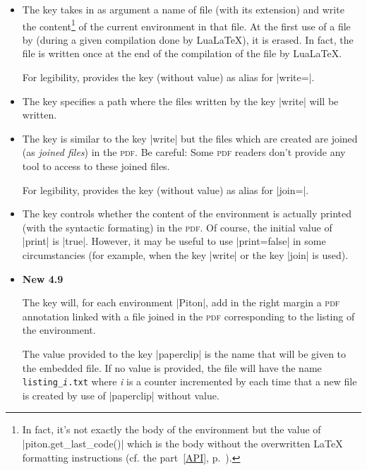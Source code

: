 \documentclass{article}
\begin{document}
\bigskip
\begin{itemize}
\item {} The key  takes in as argument a name of
file (with its extension) and write the content\footnote{In fact, it's not
exactly the body of the environment but the value of |piton.get_last_code()|
which is the body without the overwritten LaTeX formatting instructions (cf.
the part~\ref{API}, p.~\pageref{API}).} of the current environment in
that file. At the first use of a file by  (during a given
compilation done by LuaLaTeX), it is erased. In fact, the file is written once at
the end of the compilation of the file by LuaLaTeX.

For legibility,  provides the key  (without value)
as alias for |write={}|.

\item {} The key  specifies a path
where the files written by the key |write| will be written.

\item {}

The key  is similar to the key |write| but the files which
are created are joined (as \emph{joined files}) in the \textsc{pdf}. Be
careful: Some \textsc{pdf} readers don't provide any tool to access to these
joined files.

For legibility,  provides the key  (without value)
as alias for |join={}|.

\item {}
The key  controls whether the content of the environment is 
actually printed (with the syntactic formating) in the \textsc{pdf}. Of
course, the initial value of |print| is |true|. However, it may be useful to
use |print=false| in some circumstancies (for example, when the key |write| or
the key |join| is used).

\item {}
\colorbox{yellow!50}{\textbf{New 4.9}}

\nobreak
The key  will, for each environment |{Piton}|, add in the right
margin a \textsc{pdf} annotation linked with a file joined in the \textsc{pdf}
corresponding to the listing of the environment.

The value provided to the key |paperclip| is the name that will be given to the embedded
file. If no value is provided, the file will have the name \texttt{listing_\textsl{i}.txt}
where \textsl{i} is a counter incremented by  each time that a new file is
created by use of |paperclip| without value.


\end{itemize}
\end{document}
